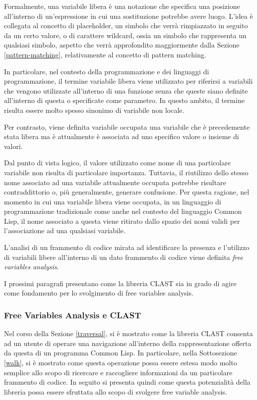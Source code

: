 Formalmente, una variabile libera è una notazione che specifica una posizione
all'interno di un'espressione in cui una sostituzione potrebbe avere luogo.
L'idea è collegata al concetto di placeholder, un simbolo che verrà rimpiazzato
in seguito da un certo valore, o di carattere wildcard, ossia un simbolo che
rappresenta un qualsiasi simbolo, aspetto che verrà approfondito maggiormente
dalla Sezione \ref{pattern-matching}, relativamente al concetto di pattern
matching.

In particolare, nel contesto della programmazione e dei linguaggi di
programmazione, il termine variabile libera viene utilizzato per riferirsi a
variabili che vengono utilizzate all'interno di una funzione senza che queste
siano definite all'interno di questa o specificate come parametro. In questo
ambito, il termine risulta essere molto spesso sinonimo di variabile non
locale.

Per contrasto, viene definita variabile occupata una variabile che è
precedemente stata libera ma è attualmente è associata ad uno specifico valore o
insieme di valori.

Dal punto di vista logico, il valore utilizzato come nome di una particolare
variabile non risulta di particolare importanza. Tuttavia, il riutilizzo dello
stesso nome associato ad una variabile attualmente occupata potrebbe risultare
contraddittorio o, più generalmente, generare confusione. Per questa ragione,
nel momento in cui una variabile libera viene occupata, in un linguaggio di
programmazione tradizionale come anche nel contesto del linguaggio Common Lisp,
il nome associato a questa viene ritirato dallo spazio dei nomi validi per
l'associazione ad una qualsiasi variabile.

L'analisi di un frammento di codice mirata ad identificare la presenza e
l'utilizzo di variabili libere all'interno di un dato frammento di codice viene
definita \textit{free variables analysis}.

I prossimi paragrafi presentano come la libreria CLAST sia in grado di agire
come fondamento per lo svolgimento di free variables analysis.

\subsubsection{Free Variables Analysis e CLAST}

Nel corso della Sezione \ref{traversal}, si è mostrato come la libreria CLAST
consenta ad un utente di operare una navigazione all'interno della
rappresentazione offerta da questa di un programma Common Lisp. In particolare,
nella Sottosezione \ref{walk}, si è mostrato come questa operazione possa essere
estesa modo molto semplice allo scopo di ricercare e raccogliere informazioni da
un particolare frammento di codice. In seguito si presenta quindi come questa
potenzialità della libreria possa essere sfruttata allo scopo di svolgere free
variable analysis.

